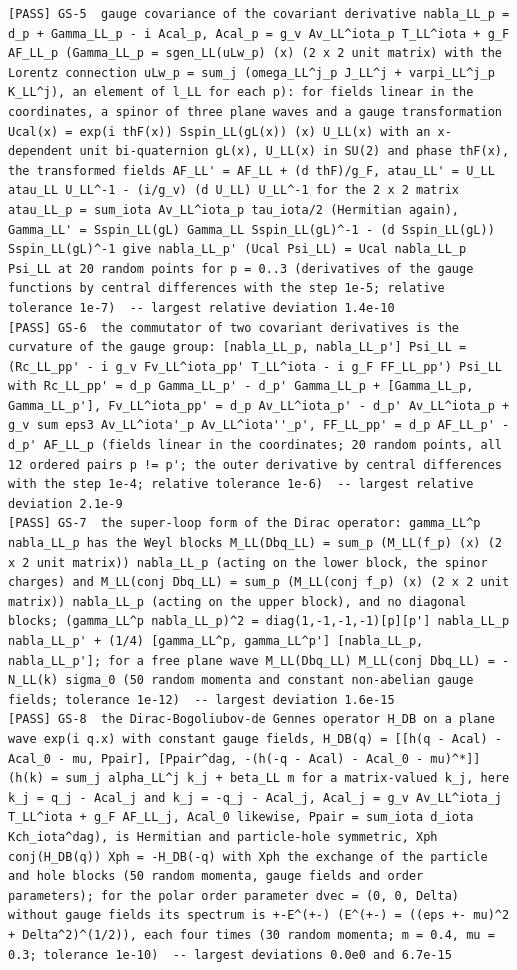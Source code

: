 \documentclass[
  10pt,
]{article}
\begin{document}
\begin{verbatim}
[PASS] GS-5  gauge covariance of the covariant derivative nabla_LL_p = d_p + Gamma_LL_p - i Acal_p, Acal_p = g_v Av_LL^iota_p T_LL^iota + g_F AF_LL_p (Gamma_LL_p = sgen_LL(uLw_p) (x) (2 x 2 unit matrix) with the Lorentz connection uLw_p = sum_j (omega_LL^j_p J_LL^j + varpi_LL^j_p K_LL^j), an element of l_LL for each p): for fields linear in the coordinates, a spinor of three plane waves and a gauge transformation Ucal(x) = exp(i thF(x)) Sspin_LL(gL(x)) (x) U_LL(x) with an x-dependent unit bi-quaternion gL(x), U_LL(x) in SU(2) and phase thF(x), the transformed fields AF_LL' = AF_LL + (d thF)/g_F, atau_LL' = U_LL atau_LL U_LL^-1 - (i/g_v) (d U_LL) U_LL^-1 for the 2 x 2 matrix atau_LL_p = sum_iota Av_LL^iota_p tau_iota/2 (Hermitian again), Gamma_LL' = Sspin_LL(gL) Gamma_LL Sspin_LL(gL)^-1 - (d Sspin_LL(gL)) Sspin_LL(gL)^-1 give nabla_LL_p' (Ucal Psi_LL) = Ucal nabla_LL_p Psi_LL at 20 random points for p = 0..3 (derivatives of the gauge functions by central differences with the step 1e-5; relative tolerance 1e-7)  -- largest relative deviation 1.4e-10
[PASS] GS-6  the commutator of two covariant derivatives is the curvature of the gauge group: [nabla_LL_p, nabla_LL_p'] Psi_LL = (Rc_LL_pp' - i g_v Fv_LL^iota_pp' T_LL^iota - i g_F FF_LL_pp') Psi_LL with Rc_LL_pp' = d_p Gamma_LL_p' - d_p' Gamma_LL_p + [Gamma_LL_p, Gamma_LL_p'], Fv_LL^iota_pp' = d_p Av_LL^iota_p' - d_p' Av_LL^iota_p + g_v sum eps3 Av_LL^iota'_p Av_LL^iota''_p', FF_LL_pp' = d_p AF_LL_p' - d_p' AF_LL_p (fields linear in the coordinates; 20 random points, all 12 ordered pairs p != p'; the outer derivative by central differences with the step 1e-4; relative tolerance 1e-6)  -- largest relative deviation 2.1e-9
[PASS] GS-7  the super-loop form of the Dirac operator: gamma_LL^p nabla_LL_p has the Weyl blocks M_LL(Dbq_LL) = sum_p (M_LL(f_p) (x) (2 x 2 unit matrix)) nabla_LL_p (acting on the lower block, the spinor charges) and M_LL(conj Dbq_LL) = sum_p (M_LL(conj f_p) (x) (2 x 2 unit matrix)) nabla_LL_p (acting on the upper block), and no diagonal blocks; (gamma_LL^p nabla_LL_p)^2 = diag(1,-1,-1,-1)[p][p'] nabla_LL_p nabla_LL_p' + (1/4) [gamma_LL^p, gamma_LL^p'] [nabla_LL_p, nabla_LL_p']; for a free plane wave M_LL(Dbq_LL) M_LL(conj Dbq_LL) = -N_LL(k) sigma_0 (50 random momenta and constant non-abelian gauge fields; tolerance 1e-12)  -- largest deviation 1.6e-15
[PASS] GS-8  the Dirac-Bogoliubov-de Gennes operator H_DB on a plane wave exp(i q.x) with constant gauge fields, H_DB(q) = [[h(q - Acal) - Acal_0 - mu, Ppair], [Ppair^dag, -(h(-q - Acal) - Acal_0 - mu)^*]] (h(k) = sum_j alpha_LL^j k_j + beta_LL m for a matrix-valued k_j, here k_j = q_j - Acal_j and k_j = -q_j - Acal_j, Acal_j = g_v Av_LL^iota_j T_LL^iota + g_F AF_LL_j, Acal_0 likewise, Ppair = sum_iota d_iota Kch_iota^dag), is Hermitian and particle-hole symmetric, Xph conj(H_DB(q)) Xph = -H_DB(-q) with Xph the exchange of the particle and hole blocks (50 random momenta, gauge fields and order parameters); for the polar order parameter dvec = (0, 0, Delta) without gauge fields its spectrum is +-E^(+-) (E^(+-) = ((eps +- mu)^2 + Delta^2)^(1/2)), each four times (30 random momenta; m = 0.4, mu = 0.3; tolerance 1e-10)  -- largest deviations 0.0e0 and 6.7e-15

\end{verbatim}
\end{document}
